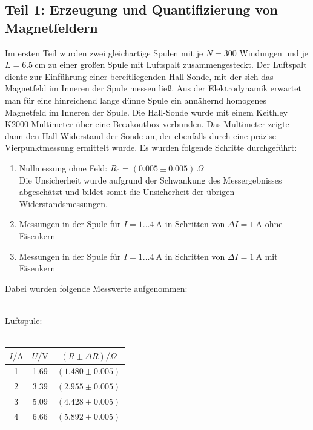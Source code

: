 \documentclass[german,  %
parskip=full,  %
]{scrartcl}
\begin{document}
\subsection{Teil 1: Erzeugung und Quantifizierung von Magnetfeldern}
Im ersten Teil wurden zwei gleichartige Spulen mit je \(N=300\) Windungen und je \(L=6.5 \ \mathrm{cm}\) zu einer großen Spule mit Luftspalt zusammengesteckt. Der Luftspalt diente zur Einführung einer bereitliegenden Hall-Sonde, mit der sich das Magnetfeld im Inneren der Spule messen ließ. Aus der Elektrodynamik erwartet man für eine hinreichend lange dünne Spule ein annähernd homogenes Magnetfeld im Inneren der Spule. Die Hall-Sonde wurde mit einem Keithley K2000 Multimeter über eine Breakoutbox verbunden. Das Multimeter zeigte dann den Hall-Widerstand der Sonde an, der ebenfalls durch eine präzise Vierpunktmessung ermittelt wurde. Es wurden folgende Schritte durchgeführt:
\begin{enumerate}
\item Nullmessung ohne Feld: \(R_0 = (0.005 \pm 0.005) \ \Omega\) \\
Die Unsicherheit wurde aufgrund der Schwankung des Messergebnisses abgeschätzt und bildet somit die Unsicherheit der übrigen Widerstandsmessungen.
\item Messungen in der Spule für \(I = 1\hdots 4 \ \mathrm{A}\) in Schritten von \(\Delta I = 1 \  \mathrm{A}\) ohne Eisenkern
\item Messungen in der Spule für \(I = 1\hdots 4 \ \mathrm{A}\) in Schritten von \(\Delta I = 1 \  \mathrm{A}\) mit Eisenkern
\end{enumerate}
Dabei wurden folgende Messwerte aufgenommen: \\\\
\begin{minipage}{0.45\textwidth}
\underline{Luftspule:} \\\\
\begin{tabular}{|c|c|c|}
\hline
\(I/ \mathrm{A}\) & \(U / \mathrm{V}\) & \((R \pm \Delta R )/ \Omega\) \\\hline
1 & 1.69 & \((1.480 \pm 0.005)\) \\\hline
2 & 3.39 & \((2.955 \pm 0.005)\) \\\hline
3 & 5.09 & \((4.428 \pm 0.005)\) \\\hline
4 & 6.66 & \((5.892 \pm 0.005)\) \\\hline
\end{tabular}
\end{minipage}
\end{document}
